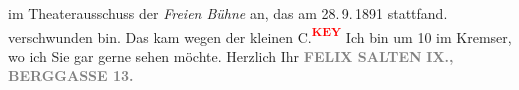 \begin{ledgroupsized}[t]{13cm}
{{{                  im Theaterausschuss der \emph{Freien Bühne} an, das
                  am 28. 9. 1891
                  stattfand.}}}\label{K_L03106-1h} verschwunden bin. Das kam wegen der kleinen C.\textcolor{red}{\textsuperscript{\textbf{KEY}}}\pend
           \pstart
           Ich bin um 10 im Kremser, wo ich Sie
               gar gerne sehen {\pb}möchte. \pend
           \pstart  Herzlich Ihr \pend{}\pstart
           \centering{}\textcolor{gray}{\textbf{FELIX SALTEN}}\pend
           \pstart
           \noindent{}\raggedleft{}\textcolor{gray}{\textbf{IX., BERGGASSE 13. }}\pend
           
         
         \endnumbering{}\end{ledgroupsized}\begin{anhang}\end{anhang}\newcommand{\dateiname}{L03106}\newcommand{\titel}{Felix Salten an Arthur Schnitzler, [28. 9. 1891?]}\newcommand{\editorInnen}{Martin Anton Müller und Laura Untner}
      